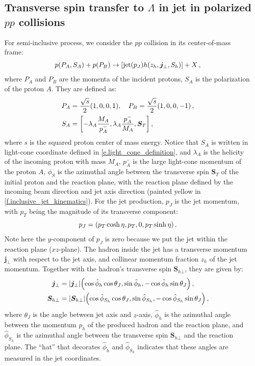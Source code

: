\documentclass[a4paper, 11 pt]{article}
\begin{document}
\subsection{Transverse spin transfer to $\Lambda$ in jet in polarized $pp$ collisions}

For semi-inclusive process, we consider the $pp$ collision in its center-of-mass frame:
\begin{equation}
p \pqty{P_A, S_A} + p \pqty{P_B}
\to
\bqty{\mathrm{jet}(p_J) h \pqty{z_h, \boldsymbol{j}_{\perp}, S_h}} + X
\, ,
\end{equation}
where $P_A$ and $P_B$ are the momenta of the incident protons, $S_A$ is the polarization of the proton $A$.
They are defined as:
\begin{align}
P_A
& =
\frac{\sqrt{s}}{2} \pqty{1, 0, 0,  1} ,
\quad
P_B
=
\frac{\sqrt{s}}{2} \pqty{1, 0, 0, -1}
\, , \\
S_A
& =
\bqty{-\lambda_A \frac{M_A}{p_A^-}, \lambda_A \frac{p_A^-}{M_A}, \boldsymbol{S}_T}
\, ,
\end{align}
where $s$ is the squared proton center of mass energy.
Notice that $S_A$ is written in light-cone coordinate defined in \cref{e.light_cone_definition}, and $\lambda_A$ is the helicity of the incoming proton with mass $M_A$, $p_A^-$ is the large light-cone momentum of the proton $A$, $\phi _{S}$ is the azimuthal angle between the transverse spin $\boldsymbol{S}_{T}$ of the initial proton and the reaction plane, with the reaction plane defined by the incoming beam direction and jet axis direction (painted yellow in \cref{f.inclusive_jet_kinematics}).
For the jet production, $p_J$ is the jet momentum, with $p_T$ being the magnitude of its transverse component:
\begin{equation}
p_J = \pqty{p_T \cosh{\eta}, p_T, 0, p_T \sinh{\eta}}
\, .
\end{equation}
Note here the $y$-component of $p_J$ is zero because we put the jet within the reaction plane ($xz$-plane).
The hadron inside the jet has a transverse momentum $\boldsymbol{j}_{\perp}$ with respect to the jet axis, and collinear momentum fraction $z_h$ of the jet momentum.
Together with the hadron's transverse spin $\boldsymbol{S}_{h \bot}$, they are given by:
\begin{align}
\boldsymbol{j}_{\perp}
& =
\abs{\boldsymbol{j}_{\perp}}
\pqty{\cos{\hat{\phi}_h} \cos{\theta _J}, \sin{\hat{\phi}_h}, -\cos{\hat{\phi}_h} \sin{\theta _J}}
\, , \label{e.j_T_parameterization} \\
\boldsymbol{S}_{h \bot}
& =
\abs{\boldsymbol{S}_{h \bot}}
\pqty{\cos{\hat{\phi}_{S_h}} \cos{\theta _J}, \sin{\hat{\phi}_{S_h}}, -\cos{\hat{\phi}_{S_h}} \sin{\theta _J}}
\, , \label{e.S_hT_parameterization}
\end{align}
where $\theta_J$ is the angle between jet axis and $z$-axis, $\hat{\phi}_h$ is the azimuthal angle between the momentum $p_h$ of the produced hadron and the reaction plane, and $\hat{\phi}_{S_h}$ is the azimuthal angle between the transverse spin $\boldsymbol{S}_{h \bot}$ and the reaction plane.
The ``hat'' that decorates $\hat{\phi}_h$ and $\hat{\phi}_{S_h}$ indicates that these angles are measured in the jet coordinates.
\end{document}
